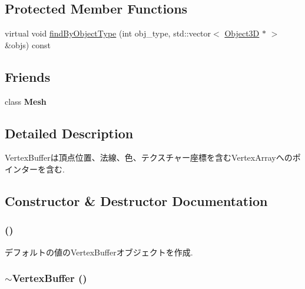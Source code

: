 \subsection*{Protected Member Functions}
\begin{CompactItemize}
\item 
virtual void \hyperlink{classm3g_1_1VertexBuffer_4dadb21b568b0230fac106f15040138c}{findByObjectType} (int obj\_\-type, std::vector$<$ \hyperlink{classm3g_1_1Object3D}{Object3D} $\ast$ $>$ \&objs) const 
\end{CompactItemize}
\subsection*{Friends}
\begin{CompactItemize}
\item 
\hypertarget{classm3g_1_1VertexBuffer_a41a130f156b145bffb3f4b5172c4c93}{
class \textbf{Mesh}}
\label{classm3g_1_1VertexBuffer_a41a130f156b145bffb3f4b5172c4c93}

\end{CompactItemize}


\subsection{Detailed Description}
VertexBufferは頂点位置、法線、色、テクスチャー座標を含むVertexArrayへのポインターを含む. 

\subsection{Constructor \& Destructor Documentation}
\hypertarget{classm3g_1_1VertexBuffer_fd7b13840c99c57d27316c8f8434dc49}{
\subsubsection[{VertexBuffer}]{ ()}}
\label{classm3g_1_1VertexBuffer_fd7b13840c99c57d27316c8f8434dc49}


デフォルトの値のVertexBufferオブジェクトを作成. \hypertarget{classm3g_1_1VertexBuffer_0e5e1dbdc4295ff9aa1e15e0ce3624af}{
\subsubsection[{$\sim$VertexBuffer}]{\setlength{\rightskip}{0pt plus 5cm}$\sim${\bf VertexBuffer} ()}}
\label{classm3g_1_1VertexBuffer_0e5e1dbdc4295ff9aa1e15e0ce3624af}


